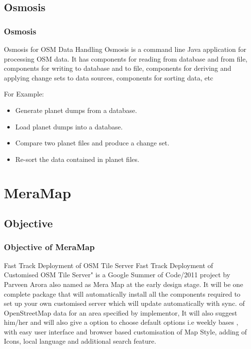 \documentclass{beamer}
\begin{document}
\subsection{Osmosis}
\begin{frame}
\frametitle{Osmosis}
\begin{block}{Osmosis for OSM Data Handling}
Osmosis is a command line Java application for processing OSM data. It has components for reading from database and from file, components for writing to database and to file, components for deriving and applying change sets to data sources, components for sorting data, etc
\end{block}
\pause
\begin{block}{For Example:}
\begin{itemize}
\pause
\item Generate planet dumps from a database.
\pause
\item Load planet dumps into a database.
\pause
\item Compare two planet files and produce a change set.
\pause
\item Re-sort the data contained in planet files.
\end{itemize}
\end{block}
\end{frame}

\newpage
\section{MeraMap}
\subsection{Objective}
\begin{frame}
\frametitle{Objective of MeraMap}
\begin{block}{Fast Track Deployment of OSM Tile Server}
Fast Track Deployment of Customised OSM Tile Server" is a Google Summer of Code/2011 project by Parveen Arora also named as Mera Map at the early design stage. It will be one complete package that will automatically install all the components required to set up your own customised server which will update automatically with sync. of OpenStreetMap data for an area specified by implementor, It will also suggest him/her and will also give a option to choose default options i.e weekly bases , with easy user interface and browser based customisation of Map Style, adding of Icons, local language and additional search feature.
\end{block}
\end{frame}
\end{document}
